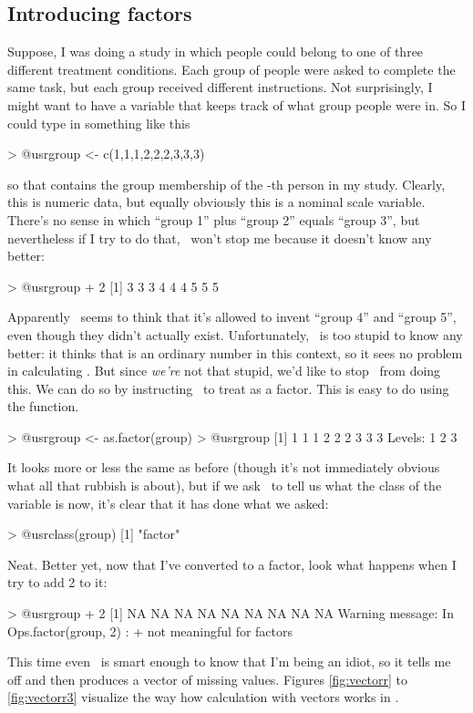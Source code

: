 \subsection{Introducing factors}

Suppose, I was doing a study in which people could belong to one of three different treatment conditions. Each group of people were asked to complete the same task, but each group received different instructions. Not surprisingly, I might want to have a variable that keeps track of what group people were in. So I could type in something like this
\begin{rblock1}
> @usr{group <- c(1,1,1,2,2,2,3,3,3)}
\end{rblock1}
so that  contains the group membership of the -th person in my study. Clearly, this is numeric data, but equally obviously this is a nominal scale variable. There's no sense in which ``group 1'' plus ``group 2'' equals ``group 3'', but nevertheless if I try to do that, \R\ won't stop me because it doesn't know any better:
\begin{rblock1}
> @usr{group + 2}
 [1] 3 3 3 4 4 4 5 5 5 
\end{rblock1}
Apparently \R\ seems to think that it's allowed to invent ``group 4'' and ``group 5'', even though they didn't actually exist. Unfortunately, \R\ is too stupid to know any better: it thinks that  is an ordinary number in this context, so it sees no problem in calculating . But since {\it we're} not that stupid, we'd like to stop \R\ from doing this. We can do so by instructing \R\ to treat  as a factor.  This is easy to do using the  function. 
\begin{rblock1}
> @usr{group <- as.factor(group)}
> @usr{group}
 [1] 1 1 1 2 2 2 3 3 3 
 Levels: 1 2 3
\end{rblock1}
It looks more or less the same as before (though it's not immediately obvious what all that  rubbish is about), but if we ask \R\ to tell us what the class of the  variable is now, it's clear that it has done what we asked:
\begin{rblock1}
> @usr{class(group)}
[1] "factor"
\end{rblock1}
Neat. Better yet, now that I've converted  to a factor, look what happens when I try to add 2 to it:
\begin{rblock1}
> @usr{group + 2}
[1] NA NA NA NA NA NA NA NA NA
Warning message:
In Ops.factor(group, 2) : + not meaningful for factors
\end{rblock1}
This time even \R\ is smart enough to know that I'm being an idiot, so it tells me off and then produces a vector of missing values. %
Figures \ref{fig:vectorr} to \ref{fig:vectorr3} visualize the way how calculation with vectors works in \R.

